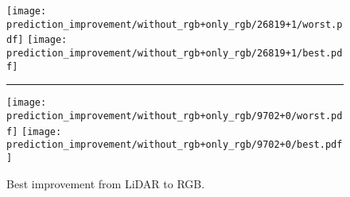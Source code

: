 \begin{figure}[H]
  \centering
  \texttt{[image: prediction\_improvement/without\_rgb+only\_rgb/26819+1/worst.pdf]}
  \texttt{[image: prediction\_improvement/without\_rgb+only\_rgb/26819+1/best.pdf]}
  \rule[1ex]{\textwidth}{.5pt}
  \texttt{[image: prediction\_improvement/without\_rgb+only\_rgb/9702+0/worst.pdf]}
  \texttt{[image: prediction\_improvement/without\_rgb+only\_rgb/9702+0/best.pdf]}
  \caption{%
    Best improvement from LiDAR to RGB.
  }%
  \label{fig:rgb-better-than-lidar}
\end{figure}
